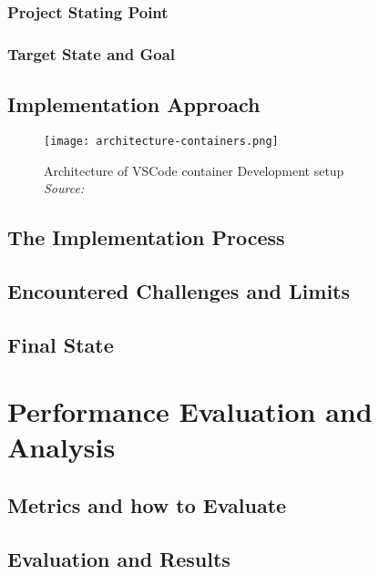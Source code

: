 \documentclass[12pt, a4paper]{article}
\begin{document}
        \subsubsection{Project Stating Point}
        \subsubsection{Target State and Goal}\label{sssec::goal}

    \subsection{Implementation Approach}\label{ssec::imp_approach}
    \begin{figure}[]
        \centering
        \texttt{[image: architecture-containers.png]}
        \caption{Architecture of \ac{VSCode} container Development setup \\\textit{Source:~\cite{vscodedevcontainer}}}\label{fig::vscodecontainer}
    \end{figure}

    \subsection{The Implementation Process}\label{ssec::imp_process}
    \subsection{Encountered Challenges and Limits}
    \subsection{Final State}\label{sec::final}


\section{Performance Evaluation and Analysis}\label{sec::eval}
    \subsection{Metrics and how to Evaluate}
    \subsection{Evaluation and Results}
\end{document}
